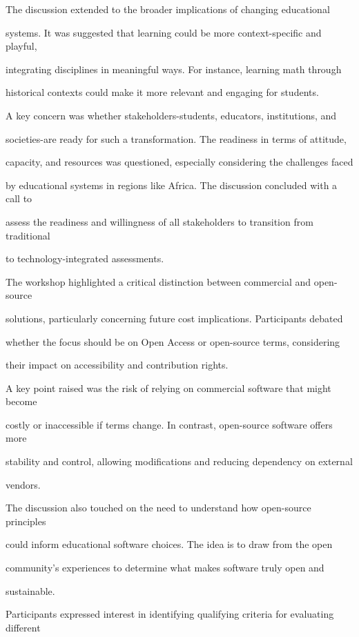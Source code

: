 \documentclass[11pt]{article}
\begin{document}
The discussion extended to the broader implications of changing educational

systems. It was suggested that learning could be more context-specific and playful,

integrating disciplines in meaningful ways. For instance, learning math through

historical contexts could make it more relevant and engaging for students.

A key concern was whether stakeholders-students, educators, institutions, and

societies-are ready for such a transformation. The readiness in terms of attitude,

capacity, and resources was questioned, especially considering the challenges faced

by educational systems in regions like Africa. The discussion concluded with a call to

assess the readiness and willingness of all stakeholders to transition from traditional

to technology-integrated assessments.

The workshop highlighted a critical distinction between commercial and open-source

solutions, particularly concerning future cost implications. Participants debated

whether the focus should be on Open Access or open-source terms, considering

their impact on accessibility and contribution rights.

A key point raised was the risk of relying on commercial software that might become

costly or inaccessible if terms change. In contrast, open-source software offers more

stability and control, allowing modifications and reducing dependency on external

vendors.

The discussion also touched on the need to understand how open-source principles

could inform educational software choices. The idea is to draw from the open

community's experiences to determine what makes software truly open and

sustainable.

Participants expressed interest in identifying qualifying criteria for evaluating different
\end{document}
